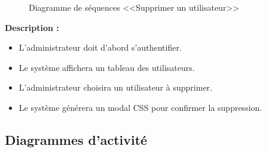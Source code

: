\documentclass[12pt]{report}
\begin{document}
\begin{figure}[h]
\centering
    \centerline{}
    \caption{Diagramme de séquences <<Supprimer un utilisateur>>}
\end{figure}

\vspace{0.3in}

\textbf{Description :}

\begin{itemize}
    \item L'administrateur doit d'abord s'authentifier.
    \item Le système affichera un tableau des utilisateurs.
    \item L'administrateur choisira un utilisateur à supprimer.
    \item Le système générera un modal CSS pour confirmer la suppression.
\end{itemize}

\newpage

\subsection{Diagrammes d'activité}
\end{document}
